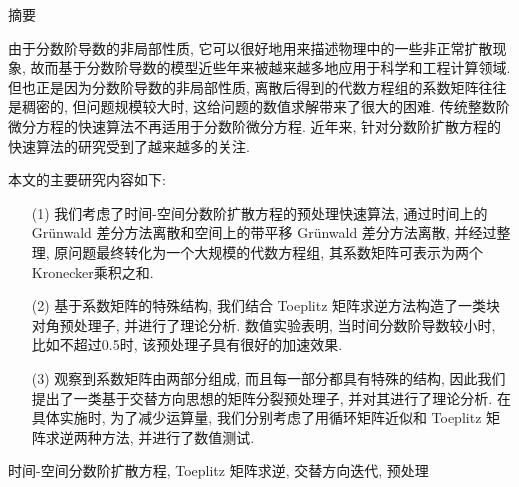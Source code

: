 \thispagestyle{plain}
{}

\centerline{\heiti 摘\quad 要}

\linespread{1.4} \bigskip
由于分数阶导数的非局部性质,
它可以很好地用来描述物理中的一些非正常扩散现象, 
故而基于分数阶导数的模型近些年来被越来越多地应用于科学和工程计算领域.
但也正是因为分数阶导数的非局部性质, 离散后得到的代数方程组的系数矩阵往往是稠密的,
但问题规模较大时, 这给问题的数值求解带来了很大的困难.
传统整数阶微分方程的快速算法不再适用于分数阶微分方程.
近年来, 针对分数阶扩散方程的快速算法的研究受到了越来越多的关注. 

本文的主要研究内容如下:
\begin{itemize}

\item[(1)] 
我们考虑了时间-空间分数阶扩散方程的预处理快速算法,
通过时间上的 Gr\"unwald 差分方法离散和空间上的带平移 Gr\"unwald 差分方法离散,
并经过整理, 原问题最终转化为一个大规模的代数方程组, 
其系数矩阵可表示为两个Kronecker乘积之和.
\medskip

\item[(2)]
基于系数矩阵的特殊结构, 我们结合 Toeplitz 
矩阵求逆方法构造了一类块对角预处理子, 并进行了理论分析.
数值实验表明, 当时间分数阶导数较小时, 比如不超过0.5时, 该预处理子具有很好的加速效果.
\medskip

\item[(3)]
观察到系数矩阵由两部分组成, 而且每一部分都具有特殊的结构,
因此我们提出了一类基于交替方向思想的矩阵分裂预处理子, 并对其进行了理论分析.
在具体实施时, 为了减少运算量, 我们分别考虑了用循环矩阵近似和
Toeplitz 矩阵求逆两种方法, 并进行了数值测试.

\end{itemize}

\bigskip

时间-空间分数阶扩散方程, Toeplitz 矩阵求逆, 交替方向迭代, 预处理
